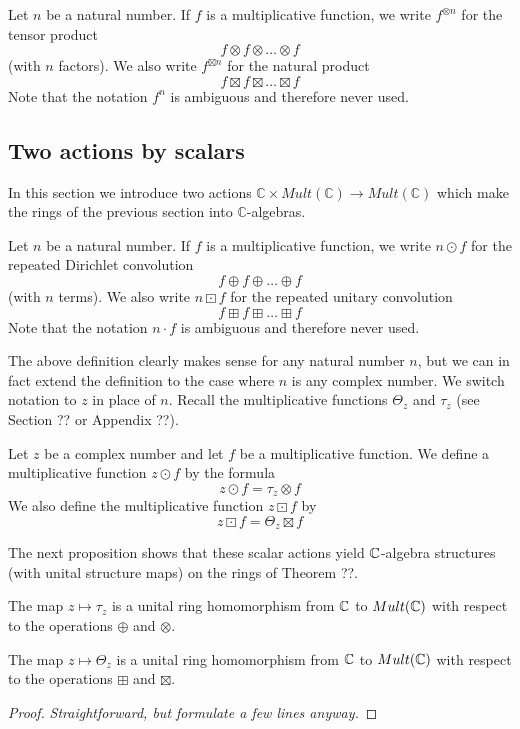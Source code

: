 \begin{definition}
Let $n$ be a natural number. If $f$ is a multiplicative function, we write $f^{\otimes n}$ for the tensor product 
$$   f \otimes f \otimes \ldots \otimes f  $$
(with $n$ factors). We also write $f^{\boxtimes n}$ for the natural product
$$   f \boxtimes f \boxtimes \ldots \boxtimes f  $$
Note that the notation $f^n$ is ambiguous and therefore never used.
\end{definition}



\subsection{Two actions by scalars}

In this section we introduce two actions $\mathbb{C} \times Mult(\mathbb{C}) \to Mult(\mathbb{C})$ which make the rings of the previous section into $\mathbb{C}$-algebras.

\begin{definition}
Let $n$ be a natural number. If $f$ is a multiplicative function, we write $n \odot f $ for the repeated Dirichlet convolution 
$$   f \oplus f \oplus \ldots \oplus f  $$
(with $n$ terms). We also write $n \boxdot f$ for the repeated unitary convolution
$$   f \boxplus f \boxplus \ldots \boxplus f  $$
Note that the notation $n \cdot f$ is ambiguous and therefore never used.
\end{definition}

The above definition clearly makes sense for any natural number $n$, but we can in fact extend the definition to the case where $n$ is any complex number. We switch notation to $z$ in place of $n$. Recall the multiplicative functions $\Theta_z$ and $\tau_z$ (see Section ?? or Appendix ??).


\begin{definition}
Let $z$ be a complex number and let $f$ be a multiplicative function. We define a multiplicative function $z \odot f$ by the formula
$$  z \odot f = \tau_z \otimes f $$
We also define the multiplicative function $z \boxdot f$ by
$$ z \boxdot f = \Theta_z \boxtimes f  $$
\end{definition}
The next proposition shows that these scalar actions yield $\mathbb{C}$-algebra structures (with unital structure maps) on the rings of Theorem ??. 
\begin{proposition}
The map $z \mapsto \tau_z$ is a unital ring homomorphism from $\mathbb{C}$ to $Mult(\mathbb{C})$ with respect to the operations $\oplus$ and $\otimes$.

The map $z \mapsto \Theta_z$ is a unital ring homomorphism from $\mathbb{C}$ to $Mult(\mathbb{C})$ with respect to the operations $\boxplus$ and $\boxtimes$.
\end{proposition}
\begin{proof}
\emph{Straightforward, but formulate a few lines anyway.}
\end{proof}

